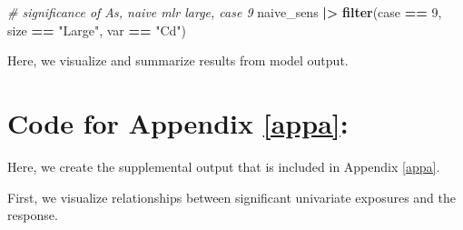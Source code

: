 \documentclass[12pt, twoside]{amherstthesis}
\newenvironment{Shaded}{\begin{snugshade}}{\end{snugshade}}
\newcommand{\CommentTok}[1]{\textcolor[rgb]{0.56,0.35,0.01}{\textit{#1}}}
\newcommand{\DecValTok}[1]{\textcolor[rgb]{0.00,0.00,0.81}{#1}}
\newcommand{\FunctionTok}[1]{\textcolor[rgb]{0.13,0.29,0.53}{\textbf{#1}}}
\newcommand{\NormalTok}[1]{#1}
\newcommand{\SpecialCharTok}[1]{\textcolor[rgb]{0.81,0.36,0.00}{\textbf{#1}}}
\newcommand{\StringTok}[1]{\textcolor[rgb]{0.31,0.60,0.02}{#1}}
\begin{document}
\scriptsize
\begin{Shaded}
\begin{Highlighting}[]
\CommentTok{\# significance of As, naive mlr large, case 9}
\NormalTok{naive\_sens }\SpecialCharTok{|\textgreater{}} \FunctionTok{filter}\NormalTok{(case }\SpecialCharTok{==} \DecValTok{9}\NormalTok{, size }\SpecialCharTok{==} \StringTok{"Large"}\NormalTok{, var }\SpecialCharTok{==} \StringTok{"Cd"}\NormalTok{)}
\end{Highlighting}
\end{Shaded}
\normalsize

Here, we visualize and summarize results from model output.

\hypertarget{code-for-appendix-refappa}{%
\section{Code for Appendix \ref{appa}:}\label{code-for-appendix-refappa}}

Here, we create the supplemental output that is included in Appendix \ref{appa}.

First, we visualize relationships between significant univariate exposures and the response.
\end{document}
